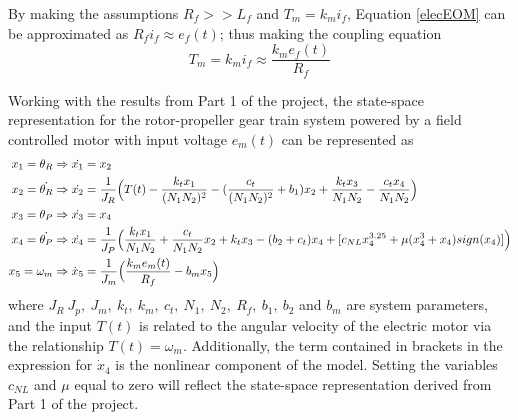 \documentclass[letterpaper,12pt]{article}
\begin{document}
By making the assumptions $R_f>>L_f$ and $T_m = k_mi_f$, Equation \ref{elecEOM} can be approximated as $R_fi_f \approx e_{f}(t)$; thus making the coupling equation
\begin{equation}
    T_m = k_m i_f \approx \frac{k_m e_f(t)}{R_f}
\end{equation}

Working with the results from Part 1 of the project, the state-space representation for the rotor-propeller gear train system powered by a field controlled motor with input voltage $e_m(t)$ can be represented as 
\begin{align*}
    x_1 = \theta_R & \Rightarrow \dot{x_1} = x_2\\
    x_2 = \dot{\theta_R} & \Rightarrow \dot{x_2} = {\small \frac{1}{J_R} \Big(T(t) -\frac{k_tx_1}{(N_1N_2)^2} - (\frac{c_t}{(N_1N_2)^2} + b_1)x_2 + \frac{k_tx_3}{N_1N_2} -\frac{c_tx_4}{N_1N_2} \Big)}\\
    x_3 = \theta_P & \Rightarrow \dot{x_3} = x_4\\
    x_4 = \dot{\theta_P} & \Rightarrow \dot{x_4} = {\small \frac{1}{J_P} \Big( \frac{k_tx_1}{N_1N_2} + \frac{c_t}{N_1N_2}x_2 + k_tx_3 - (b_2 + c_t)x_4 + [c_{NL}x_4^{3.25} + \mu(x_4^3 + x_4)sign(x_4)] \Big)}\\
    x_5 = \omega_m & \Rightarrow \dot{x}_5 = \frac{1}{J_m} \Big(\frac{k_me_m(t)}{R_f} - b_mx_5 \Big)
\end{align*}
where $J_R\ J_p,\ J_m,\ k_t,\ k_m,\ c_t,\ N_1,\ N_2,\ R_f,\ b_1,\ b_2$ and $b_m$ are system parameters, and the input $T(t)$ is related to the angular velocity of the electric motor via the relationship $T(t) = \omega_m$. Additionally, the term contained in brackets in the expression for $\dot{x}_4$ is the nonlinear component of the model. Setting the variables $c_{NL}$ and $\mu$ equal to zero will reflect the state-space representation derived from Part 1 of the project.
\end{document}
